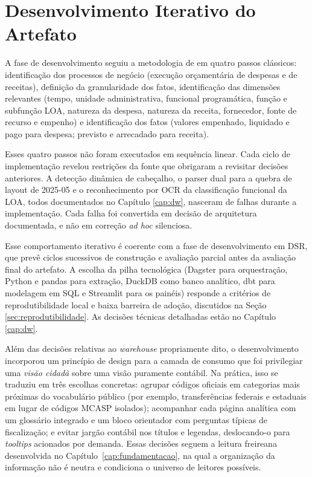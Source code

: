 \section{Desenvolvimento Iterativo do Artefato}
\label{sec:desenvolvimento}

A fase de desenvolvimento seguiu a metodologia de 
 em quatro passos clássicos: identificação dos
processos de negócio (execução orçamentária de despesas e de receitas),
definição da granularidade dos fatos, identificação das dimensões
relevantes (tempo, unidade administrativa, funcional programática,
função e subfunção LOA, natureza da despesa, natureza da receita,
fornecedor, fonte de recurso e empenho) e identificação dos fatos
(valores empenhado, liquidado e pago para despesa; previsto e
arrecadado para receita).

Esses quatro passos não foram executados em sequência linear. Cada
ciclo de implementação revelou restrições da fonte que obrigaram a
revisitar decisões anteriores. A detecção dinâmica de cabeçalho, o
parser dual para a quebra de layout de 2025-05 e o reconhecimento por
OCR da classificação funcional da LOA, todos documentados no Capítulo
\ref{cap:dw}, nasceram de falhas durante a implementação. Cada falha
foi convertida em decisão de arquitetura documentada, e não em
correção \emph{ad hoc} silenciosa.

Esse comportamento iterativo é coerente com a fase de desenvolvimento
em DSR, que prevê ciclos sucessivos de construção e avaliação parcial
antes da avaliação final do artefato. A escolha da pilha tecnológica
(Dagster para orquestração, Python e pandas para extração, DuckDB como
banco analítico, dbt para modelagem em SQL e Streamlit para os
painéis) responde a critérios de reprodutibilidade local e baixa
barreira de adoção, discutidos na Seção \ref{sec:reprodutibilidade}. As
decisões técnicas detalhadas estão no Capítulo \ref{cap:dw}.

Além das decisões relativas ao \textit{warehouse} propriamente dito, o desenvolvimento incorporou um princípio de design para a camada de consumo que foi privilegiar uma \emph{visão cidadã} sobre uma visão puramente contábil. Na prática, isso se traduziu em três escolhas concretas: agrupar códigos oficiais em categorias mais próximas do vocabulário público (por exemplo, transferências federais e estaduais em lugar de códigos MCASP isolados); acompanhar cada página analítica com um glossário integrado e um bloco orientador com perguntas típicas de fiscalização; e evitar jargão contábil nos títulos e legendas, deslocando-o para \textit{tooltips} acionados por demanda. Essas decisões seguem a leitura freireana desenvolvida no Capítulo~\ref{cap:fundamentacao}, na qual a organização da informação não é neutra e condiciona o universo de leitores possíveis.

